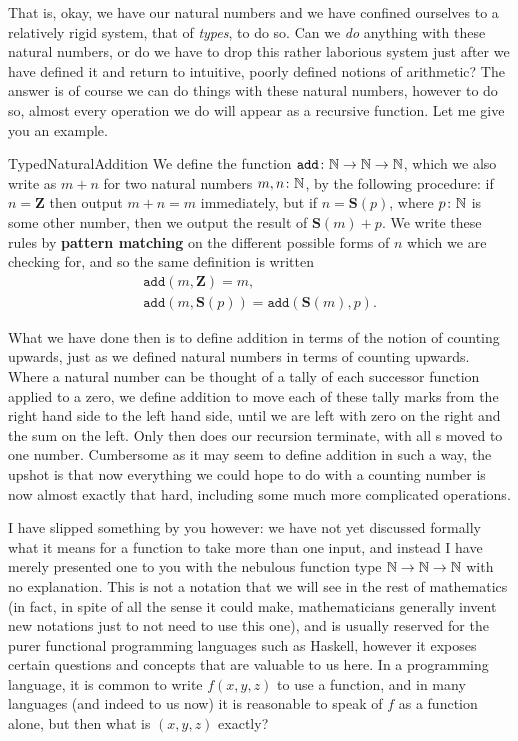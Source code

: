 \documentclass[11pt]{article}
\begin{document}
That is, okay, we have our natural numbers and we have confined ourselves to a relatively rigid system, that of \emph{types}, to do so. Can we \emph{do} anything with these natural numbers, or do we have to drop this rather laborious system just after we have defined it and return to intuitive, poorly defined notions of arithmetic? The answer is of course we can do things with these natural numbers, however to do so, almost every operation we do will appear as a recursive function. Let me give you an example.

\begin{label definition}[Addition]{TypedNaturalAddition}
We define the function $\mathtt{add}\colon \mathbb{N} \to \mathbb{N} \to \mathbb{N}$, which we also write as $m + n$ for two natural numbers $m, n \colon \mathbb{N}$, by the following procedure: if $n = \mathbf{Z}$ then output $m + n = m$ immediately, but if $n = \mathbf{S}(p)$, where $p \colon \mathbb{N}$ is some other number, then we output the result of $\mathbf{S}(m) + p$. We write these rules by \textbf{pattern matching} on the different possible forms of $n$ which we are checking for, and so the same definition is written \begin{gather*}
   \mathtt{add}(m,\mathbf{Z}) = m, \\
   \mathtt{add}(m, \mathbf{S}(p)) = \mathtt{add}(\mathbf{S}(m),p).
\end{gather*}
\end{label definition}

What we have done then is to define addition in terms of the notion of counting upwards, just as we defined natural numbers in terms of counting upwards. Where a natural number can be thought of a tally of each successor function applied to a zero, we define addition to move each of these tally marks from the right hand side to the left hand side, until we are left with zero on the right and the sum on the left. Only then does our recursion terminate, with all s moved to one number. Cumbersome as it may seem to define addition in such a way, the upshot is that now everything we could hope to do with a counting number is now almost exactly that hard, including some much more complicated operations.

I have slipped something by you however: we have not yet discussed formally what it means for a function to take more than one input, and instead I have merely presented one to you with the nebulous function type $\mathbb{N} \to \mathbb{N} \to \mathbb{N}$ with no explanation. This is not a notation that we will see in the rest of mathematics (in fact, in spite of all the sense it could make, mathematicians generally invent new notations just to not need to use this one), and is usually reserved for the purer functional programming languages such as Haskell, however it exposes certain questions and concepts that are valuable to us here. In a programming language, it is common to write $f(x,y,z)$ to use a function, and in many languages (and indeed to us now) it is reasonable to speak of $f$ as a function alone, but then what is $(x,y,z)$ exactly?
\end{document}
